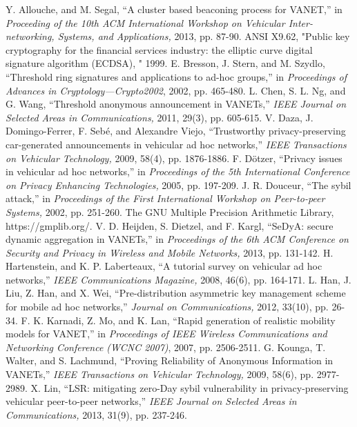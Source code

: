 \documentclass[a4paper]{article}
\begin{document}
\begin{thebibliography}{40}
 Y. Allouche, and M. Segal, ``A cluster based beaconing process for VANET,'' in \emph{Proceeding of the 10th ACM International Workshop on Vehicular Inter-networking, Systems, and Applications,} 2013, pp. 87-90.
 ANSI X9.62, "Public key cryptography for the financial services industry: the elliptic curve digital signature algorithm (ECDSA), " 1999.
 E. Bresson, J. Stern, and M. Szydlo, ``Threshold ring signatures and applications to ad-hoc groups,'' in \emph{Proceedings of Advances in Cryptology---Crypto2002}, 2002, pp. 465-480.
 L. Chen, S. L. Ng, and G. Wang, ``Threshold anonymous announcement in VANETs,'' \emph{IEEE Journal on Selected Areas in Communications,} 2011, 29(3), pp. 605-615.
 V. Daza, J. Domingo-Ferrer, F. Seb\'{e}, and Alexandre Viejo, ``Trustworthy privacy-preserving car-generated announcements in vehicular ad hoc networks,'' \emph{IEEE Transactions on Vehicular Technology,} 2009, 58(4), pp. 1876-1886.
 F. D\"{o}tzer, ``Privacy issues in vehicular ad hoc networks,'' in \emph{Proceedings of the 5th International Conference on Privacy Enhancing Technologies,} 2005, pp. 197-209.
 J. R. Douceur, ``The sybil attack,'' in \emph{Proceedings of the First International Workshop on Peer-to-peer Systems,} 2002, pp. 251-260.
 The GNU Multiple Precision Arithmetic Library, https://gmplib.org/.
 V. D. Heijden, S. Dietzel, and F. Kargl, ``SeDyA: secure dynamic aggregation in VANETs,'' in \emph{Proceedings of the 6th ACM Conference on Security and Privacy in Wireless and Mobile Networks,} 2013, pp. 131-142.
 H. Hartenstein, and K. P. Laberteaux, ``A tutorial survey on vehicular ad hoc networks,'' \emph{IEEE Communications Magazine,} 2008, 46(6), pp. 164-171.
 L. Han, J. Liu, Z. Han, and X. Wei, ``Pre-distribution asymmetric key management scheme for mobile ad hoc networks,'' \emph{Journal on Communications,} 2012, 33(10), pp. 26-34.
 F. K. Karnadi, Z. Mo, and K. Lan, ``Rapid generation of realistic mobility models for VANET,'' in \emph{Proceedings of IEEE Wireless Communications and Networking Conference (WCNC 2007)}, 2007, pp. 2506-2511.
 G. Kounga, T. Walter, and S. Lachmund, ``Proving Reliability of Anonymous Information in VANETs,'' \emph{IEEE Transactions on Vehicular Technology,} 2009, 58(6), pp. 2977-2989.
 X. Lin, ``LSR: mitigating zero-Day sybil vulnerability in privacy-preserving vehicular peer-to-peer networks,'' \emph{IEEE Journal on Selected Areas in Communications,} 2013, 31(9), pp. 237-246.

\end{thebibliography}
\end{document}
